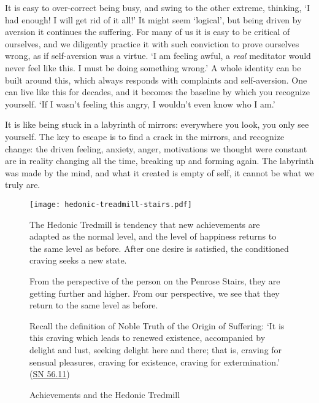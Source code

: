 It is easy to over-correct being busy, and swing to the other extreme,
thinking, `I had enough! I will get rid of it all!' It might seem
`logical', but being driven by aversion it continues the suffering. For
many of us it is easy to be critical of ourselves, and we diligently
practice it with such conviction to prove ourselves wrong, as if
self-aversion was a virtue. `I am feeling awful, a \emph{real} meditator
would never feel like this. I must be doing something wrong.' A whole
identity can be built around this, which always responds with complaints
and self-aversion. One can live like this for decades, and it becomes
the baseline by which you recognize yourself. `If I wasn't feeling this
angry, I wouldn't even know who I am.'

It is like being stuck in a labyrinth of mirrors: everywhere you look,
you only see yourself. The key to escape is to find a crack in the
mirrors, and recognize change: the driven feeling, anxiety, anger,
motivations we thought were constant are in reality changing all the
time, breaking up and forming again. The labyrinth was made by the mind,
and what it created is empty of self, it cannot be what we truly are.

\clearpage

\begin{figure}[h]
\caption{Achievements and the Hedonic Tredmill}\label{fig-hedonic-treadmill}

\centering

\texttt{[image: hedonic-treadmill-stairs.pdf]}

The Hedonic Tredmill is tendency that new achievements are adapted as the normal level,
and the level of happiness returns to the same level as before.
After one desire is satisfied, the conditioned craving seeks a new state.

\bigskip

From the perspective of the person on the Penrose Stairs,
they are getting further and higher.
From our perspective, we see that they return to the same level as before.

\bigskip

Recall the definition of Noble Truth of the Origin of Suffering:
`It is this craving which leads to renewed existence,
 accompanied by delight and lust, seeking delight here and there;
 that is, craving for sensual pleasures, craving for existence,
 craving for extermination.'
(\href{https://suttacentral.net/sn56.11/en/bodhi}{SN 56.11})

\end{figure}

